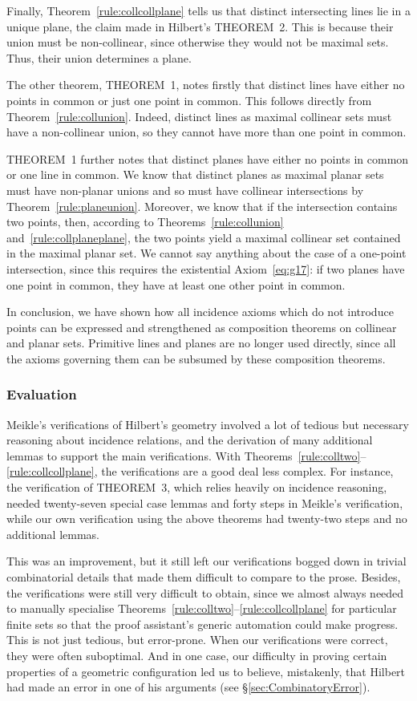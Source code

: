 Finally, Theorem~\ref{rule:collcollplane} tells us that distinct intersecting lines lie in a unique plane, the claim made in Hilbert's THEOREM~2. This is because their union must be non-collinear, since otherwise they would not be maximal sets. Thus, their union determines a plane. 

The other theorem, THEOREM~1, notes firstly that distinct lines have either no points in common or just one point in common. This follows directly from Theorem~\ref{rule:collunion}. Indeed, distinct lines as maximal collinear sets must have a non-collinear union, so they cannot have more than one point in common.

THEOREM~1 further notes that distinct planes have either no points in common or one line in common. We know that distinct planes as maximal planar sets must have non-planar unions and so must have collinear intersections by Theorem~\ref{rule:planeunion}. Moreover, we know that if the intersection contains two points, then, according to Theorems~\ref{rule:collunion} and~\ref{rule:collplaneplane}, the two points yield a maximal collinear set contained in the maximal planar set. We cannot say anything about the case of a one-point intersection, since this requires the existential Axiom~\ref{eq:g17}: if two planes have one point in common, they have at least one other point in common.

In conclusion, we have shown how all incidence axioms which do not introduce points can be expressed and strengthened as composition theorems on collinear and planar sets. Primitive lines and planes are no longer used directly, since all the axioms governing them can be subsumed by these composition theorems.

\subsubsection{Evaluation}
Meikle's verifications of Hilbert's geometry involved a lot of tedious but necessary reasoning about incidence relations, and the derivation of many additional lemmas to support the main verifications. With Theorems~\ref{rule:colltwo}--\ref{rule:collcollplane}, the verifications are a good deal less complex. For instance, the verification of THEOREM~3, which relies heavily on incidence reasoning, needed twenty-seven special case lemmas and forty steps in Meikle's verification, while our own verification using the above theorems had twenty-two steps and no additional lemmas. 

This was an improvement, but it still left our verifications bogged down in trivial combinatorial details that made them difficult to compare to the prose. Besides, the verifications were still very difficult to obtain, since we almost always needed to manually specialise Theorems~\ref{rule:colltwo}--\ref{rule:collcollplane} for particular finite sets so that the proof assistant's generic automation could make progress. This is not just tedious, but error-prone. When our verifications were correct, they were often suboptimal. And in one case, our difficulty in proving certain properties of a geometric configuration led us to believe, mistakenly, that Hilbert had made an error in one of his arguments (see \S\ref{sec:CombinatoryError}).

